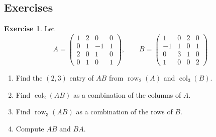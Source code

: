 \documentclass[12pt]{article}
\DeclareMathOperator{\row}{row}
\DeclareMathOperator{\col}{col}
\theoremstyle{definition}
\newtheorem{exercise}{Exercise}
\begin{document}
\subsection*{Exercises}

\begin{exercise}\label{r1-dr-three-views}
Let
\[
A=\begin{pmatrix}1&2&0&0\\0&1&-1&1\\2&0&1&0\\0&1&0&1\end{pmatrix},\qquad
B=\begin{pmatrix}1&0&2&0\\-1&1&0&1\\0&3&1&0\\1&0&0&2\end{pmatrix}
\]
\begin{enumerate}
\item Find the \((2,3)\) entry of \(AB\) from \(\row_2(A)\) and \(\col_3(B)\).
\item Find \(\col_2(AB)\) as a combination of the columns of \(A\).
\item Find \(\row_3(AB)\) as a combination of the rows of \(B\).
\item Compute \(AB\) and \(BA\).
\end{enumerate}
\end{exercise}
\end{document}
